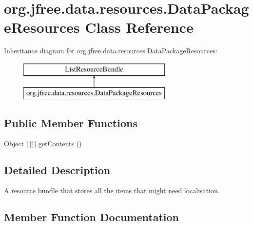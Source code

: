 \hypertarget{classorg_1_1jfree_1_1data_1_1resources_1_1_data_package_resources}{}\section{org.\+jfree.\+data.\+resources.\+Data\+Package\+Resources Class Reference}
\label{classorg_1_1jfree_1_1data_1_1resources_1_1_data_package_resources}
Inheritance diagram for org.\+jfree.\+data.\+resources.\+Data\+Package\+Resources\+:\begin{figure}[H]
\begin{center}
\leavevmode
\includegraphics[height=2.000000cm]{classorg_1_1jfree_1_1data_1_1resources_1_1_data_package_resources}
\end{center}
\end{figure}
\subsection*{Public Member Functions}
\begin{DoxyCompactItemize}
\item 
Object \mbox{[}$\,$\mbox{]}\mbox{[}$\,$\mbox{]} \mbox{\hyperlink{classorg_1_1jfree_1_1data_1_1resources_1_1_data_package_resources_aa47dd7967f6a06b3b8cd696792bf23b0}{get\+Contents}} ()
\end{DoxyCompactItemize}


\subsection{Detailed Description}
A resource bundle that stores all the items that might need localisation. 

\subsection{Member Function Documentation}
\mbox{\label{classorg_1_1jfree_1_1data_1_1resources_1_1_data_package_resources_aa47dd7967f6a06b3b8cd696792bf23b0}} 
